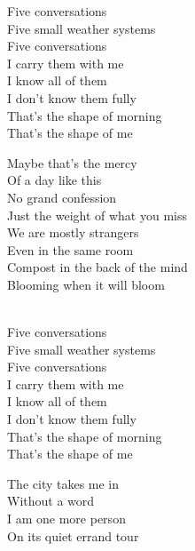 \begin{lyrics}
Five conversations\\
Five small weather systems\\
Five conversations\\
I carry them with me\\
I know all of them\\
I don’t know them fully\\
That’s the shape of morning\\
That’s the shape of me

Maybe that’s the mercy\\
Of a day like this\\
No grand confession\\
Just the weight of what you miss\\
We are mostly strangers\\
Even in the same room\\
Compost in the back of the mind\\
Blooming when it will bloom

\\
Five conversations\\
Five small weather systems\\
Five conversations\\
I carry them with me\\
I know all of them\\
I don’t know them fully\\
That’s the shape of morning\\
That’s the shape of me

The city takes me in\\
Without a word\\
I am one more person\\
On its quiet errand tour

\end{lyrics}

